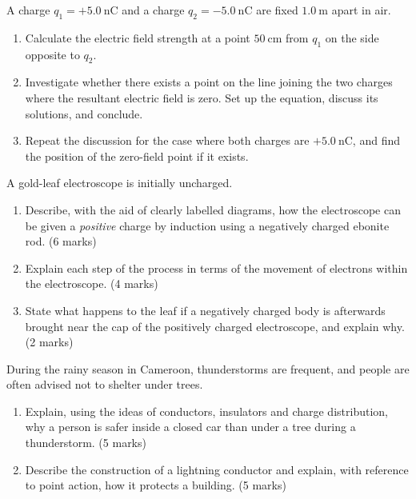 \documentclass[11pt]{article}
\newcounter{popsec}
\newcounter{popsub}
\newcommand{\courssub}[1]{%
  \stepcounter{popsub}%
  \par\vspace{9pt}\noindent{\popxbold\fontsize{11.5}{13}\selectfont\color{popink}{\color{poporange}\thepopsec.\thepopsub}\hspace{6pt}#1}\par\nopagebreak\vspace{4pt}
}
\begin{document}
\begin{exercice}
A charge $q_{1} = +5.0\ \mathrm{nC}$ and a charge $q_{2} = -5.0\ \mathrm{nC}$ are fixed $1.0\ \mathrm{m}$ apart in air.
\begin{enumerate}
\item Calculate the electric field strength at a point $50\ \mathrm{cm}$ from $q_{1}$ on the side opposite to $q_{2}$.
\item Investigate whether there exists a point on the line joining the two charges where the resultant electric field is zero. Set up the equation, discuss its solutions, and conclude.
\item Repeat the discussion for the case where both charges are $+5.0\ \mathrm{nC}$, and find the position of the zero-field point if it exists.
\end{enumerate}
\end{exercice}

\courssub{I prepare for the GCE}

\begin{exercice}
A gold-leaf electroscope is initially uncharged.
\begin{enumerate}
\item Describe, with the aid of clearly labelled diagrams, how the electroscope can be given a \emph{positive} charge by induction using a negatively charged ebonite rod. \hfill (6 marks)
\item Explain each step of the process in terms of the movement of electrons within the electroscope. \hfill (4 marks)
\item State what happens to the leaf if a negatively charged body is afterwards brought near the cap of the positively charged electroscope, and explain why. \hfill (2 marks)
\end{enumerate}
\end{exercice}

\begin{exercice}
During the rainy season in Cameroon, thunderstorms are frequent, and people are often advised not to shelter under trees.
\begin{enumerate}
\item Explain, using the ideas of conductors, insulators and charge distribution, why a person is safer inside a closed car than under a tree during a thunderstorm. \hfill (5 marks)
\item Describe the construction of a lightning conductor and explain, with reference to point action, how it protects a building. \hfill (5 marks)
\end{enumerate}
\end{exercice}
\end{document}
